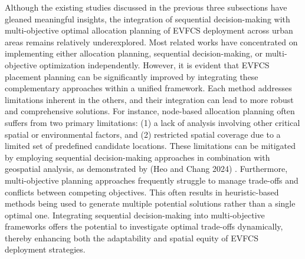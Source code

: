 \documentclass[preprint,12pt]{elsarticle}
\begin{document}
\vspace{0.5cm}

Although the existing studies discussed in the previous three subsections have gleaned meaningful insights, the integration of sequential decision-making with multi-objective optimal allocation planning of EVFCS deployment across urban areas remains relatively underexplored. Most related works have concentrated on implementing either allocation planning, sequential decision-making, or multi-objective optimization independently. However, it is evident that EVFCS placement planning can be significantly improved by integrating these complementary approaches within a unified framework. Each method addresses limitations inherent in the others, and their integration can lead to more robust and comprehensive solutions. For instance, node-based allocation planning often suffers from two primary limitations: (1) a lack of analysis involving other critical spatial or environmental factors, and (2) restricted spatial coverage due to a limited set of predefined candidate locations. These limitations can be mitigated by employing sequential decision-making approaches in combination with geospatial analysis, as demonstrated by (Heo and Chang 2024) \cite{Heo2024}. Furthermore, multi-objective planning approaches frequently struggle to manage trade-offs and conflicts between competing objectives. This often results in heuristic-based methods being used to generate multiple potential solutions rather than a single optimal one. Integrating sequential decision-making into multi-objective frameworks offers the potential to investigate optimal trade-offs dynamically, thereby enhancing both the adaptability and spatial equity of EVFCS deployment strategies. 

\vspace{0.5cm}
\end{document}
